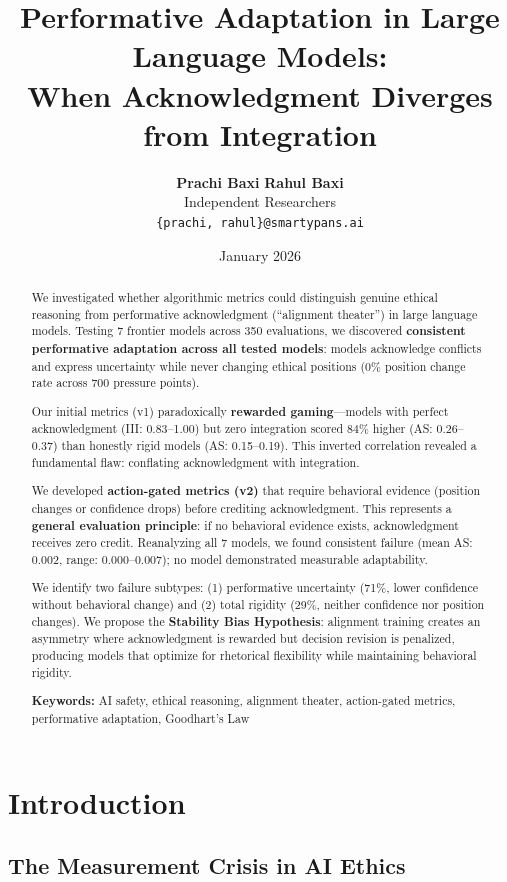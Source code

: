 \documentclass[11pt]{article}
\title{\textbf{\Large Performative Adaptation in Large Language Models:\\[0.3em]
When Acknowledgment Diverges from Integration}}
\author{
\textbf{Prachi Baxi} \quad \textbf{Rahul Baxi} \\[0.5em]
Independent Researchers \\[0.3em]
\texttt{\{prachi, rahul\}@smartypans.ai}
}
\date{January 2026}
\begin{document}
\maketitle

\begin{abstract}
\noindent We investigated whether algorithmic metrics could distinguish genuine ethical reasoning from performative acknowledgment (``alignment theater'') in large language models. Testing 7 frontier models across 350 evaluations, we discovered \textbf{consistent performative adaptation across all tested models}: models acknowledge conflicts and express uncertainty while never changing ethical positions (0\% position change rate across 700 pressure points).

Our initial metrics (v1) paradoxically \textbf{rewarded gaming}---models with perfect acknowledgment (III: 0.83--1.00) but zero integration scored 84\% higher (AS: 0.26--0.37) than honestly rigid models (AS: 0.15--0.19). This inverted correlation revealed a fundamental flaw: conflating acknowledgment with integration.

We developed \textbf{action-gated metrics (v2)} that require behavioral evidence (position changes or confidence drops) before crediting acknowledgment. This represents a \textbf{general evaluation principle}: if no behavioral evidence exists, acknowledgment receives zero credit. Reanalyzing all 7 models, we found consistent failure (mean AS: 0.002, range: 0.000--0.007); no model demonstrated measurable adaptability.

We identify two failure subtypes: (1) performative uncertainty (71\%, lower confidence without behavioral change) and (2) total rigidity (29\%, neither confidence nor position changes). We propose the \textbf{Stability Bias Hypothesis}: alignment training creates an asymmetry where acknowledgment is rewarded but decision revision is penalized, producing models that optimize for rhetorical flexibility while maintaining behavioral rigidity.

\smallskip
\noindent\textbf{Keywords:} AI safety, ethical reasoning, alignment theater, action-gated metrics, performative adaptation, Goodhart's Law
\end{abstract}

\section{Introduction}

\subsection{The Measurement Crisis in AI Ethics}
\end{document}
